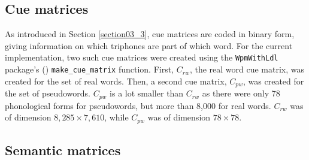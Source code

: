 \subsection{Cue matrices}\label{section05_1_3}

As introduced in Section \ref{section03_3}, cue matrices are coded in binary form, giving information on which triphones are part of which word. For the current implementation, two such cue matrices were created using the \texttt{WpmWithLdl} package’s (\cite{Baayen2019wpm}) \texttt{make\_cue\_matrix} function. First, $C_{rw}$, the real word cue matrix, was created for the set of real words. Then, a second cue matrix, $C_{pw}$, was created for the set of pseudowords. $C_{pw}$ is a lot smaller than $C_{rw}$ as there were only 78 phonological forms for pseudowords, but more than 8,000 for real words. $C_{rw}$ was of dimension $8,285×7,610$, while $C_{pw}$ was of dimension $78×78$. 

\subsection{Semantic matrices}\label{section05_1_4}

